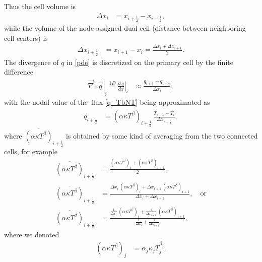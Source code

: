 \documentclass[12pt]{article}
\newcommand{\dx}{\Delta x}
\newcommand{\oh}{\frac{1}{2}}
\newcommand{\ip}{i+1}
\newcommand{\imh}{i-\oh}
\newcommand{\iph}{i+\oh}
\def\cond{\kappa}
\begin{document}
Thus the cell volume is
\begin{align}
\dx_i&=x_{\iph}-x_{\imh},
\end{align}
while the volume of the node-assigned dual cell 
(distance between neighboring cell centers) is
\begin{align}
\dx_{\iph}&=x_{i+1}-x_{i} = \frac{\dx_i+\dx_{\ip}}{2}.
\end{align}
The divergence of $q$ in \eqref{pde} is discretized on the primary cell by 
the finite difference
\begin{align}
  \left.\vec{\nabla} \cdot \vec{q}\right\rvert_i \overset{1D}{=}
  \left.\frac{d\,q}{dx}\right\rvert_i
  &\approx  \frac{q_{\iph}-q_{\imh}}{\dx_i} ,
\end{align}
with the nodal value of the~flux \eqref{q_TbNT} being approximated as
\begin{align}
  q_{\iph} &= \overline{\left(\alpha\cond T^\beta\right)}_{\iph}\,
  \frac{T_{i+1}-T_i}{\dx_{\iph}},
\end{align}
where\;
$\overline{\left(\alpha\cond T^\beta\right)}_{\iph}$\;
is obtained by some kind of averaging from the two connected cells, for example
\begin{subequations}\label{ak_aver}
\begin{align}
  \overline{\left(\alpha\cond T^\beta\right)}_{\iph}
  &= \frac{\left(\alpha\cond T^\beta\right)_i
         + \left(\alpha\cond T^\beta\right)_{i+1}}{2},\\
  \overline{\left(\alpha\cond T^\beta\right)}_{\iph}
  &= \frac{\dx_i\,\left(\alpha\cond T^\beta\right)_i
         + \dx_{i+1}\,\left(\alpha\cond T^\beta\right)_{i+1}}
           {\dx_i+\dx_{i+1}}, \quad\text{or}\\
  \overline{\left(\alpha\cond T^\beta\right)}_{\iph}
  &= \frac{\frac{1}{\dx_i}\,\left(\alpha\cond T^\beta\right)_i
         + \frac{1}{\dx_{i+1}}\,\left(\alpha\cond T^\beta\right)_{i+1}}
           {\frac{1}{\dx_i}+\frac{1}{\dx_{i+1}}},
\end{align}
\end{subequations}
where we denoted
\begin{align}
  \left(\alpha\cond T^\beta\right)_{j}
  &=\alpha_j \cond_j T_j^{\beta_j}.
\end{align}
\end{document}
